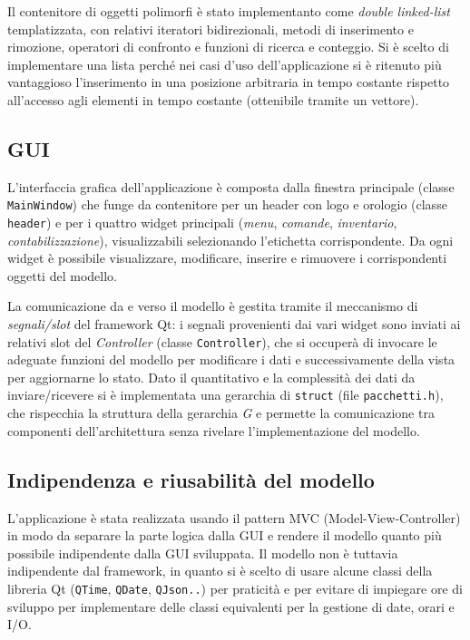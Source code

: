 \documentclass[
  10pt,
]{article}
\begin{document}
Il contenitore di oggetti polimorfi è stato implementanto come
\emph{double linked-list} templatizzata, con relativi iteratori
bidirezionali, metodi di inserimento e rimozione, operatori di confronto
e funzioni di ricerca e conteggio. Si è scelto di implementare una lista
perché nei casi d'uso dell'applicazione si è ritenuto più vantaggioso
l'inserimento in una posizione arbitraria in tempo costante rispetto
all'accesso agli elementi in tempo costante (ottenibile tramite un
vettore).

\hypertarget{gui}{%
\subsection{GUI}\label{gui}}

L'interfaccia grafica dell'applicazione è composta dalla finestra
principale (classe \texttt{MainWindow}) che funge da contenitore per un
header con logo e orologio (classe \texttt{header}) e per i quattro
widget principali (\emph{menu}, \emph{comande}, \emph{inventario},
\emph{contabilizzazione}), visualizzabili selezionando l'etichetta
corrispondente. Da ogni widget è possibile visualizzare, modificare,
inserire e rimuovere i corrispondenti oggetti del modello.

La comunicazione da e verso il modello è gestita tramite il meccanismo
di \emph{segnali/slot} del framework Qt: i segnali provenienti dai vari
widget sono inviati ai relativi slot del \emph{Controller} (classe
\texttt{Controller}), che si occuperà di invocare le adeguate funzioni
del modello per modificare i dati e successivamente della vista per
aggiornarne lo stato. Dato il quantitativo e la complessità dei dati da
inviare/ricevere si è implementata una gerarchia di \texttt{struct}
(file \texttt{pacchetti.h}), che rispecchia la struttura della gerarchia
\emph{G} e permette la comunicazione tra componenti dell'architettura
senza rivelare l'implementazione del modello.

\hypertarget{indipendenza-e-riusabilituxe0-del-modello}{%
\subsection{Indipendenza e riusabilità del
modello}\label{indipendenza-e-riusabilituxe0-del-modello}}

L'applicazione è stata realizzata usando il pattern MVC
(Model-View-Controller) in modo da separare la parte logica dalla GUI e
rendere il modello quanto più possibile indipendente dalla GUI
sviluppata. Il modello non è tuttavia indipendente dal framework, in
quanto si è scelto di usare alcune classi della libreria Qt
(\texttt{QTime}, \texttt{QDate}, \texttt{QJson..}) per praticità e per
evitare di impiegare ore di sviluppo per implementare delle classi
equivalenti per la gestione di date, orari e I/O.
\end{document}
